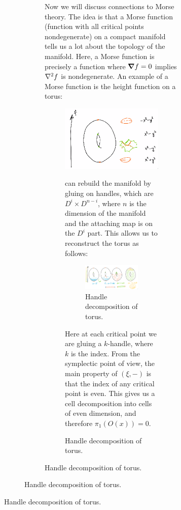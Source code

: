 \documentclass[leqno, openany]{memoir}
\theoremstyle{definition}
\theoremstyle{remark}
\theoremstyle{plain}
\theoremstyle{definition}
\theoremstyle{remark}
\begin{document}
\begin{figure}[H]
\begin{figure}[H]
\begin{figure}[H]
Now we will discuss connections to Morse theory. The idea is that a Morse
function (function with all critical points nondegenerate) on a compact
manifold tells us a lot about the topology of the manifold. Here, a Morse
function is precisely a function where $\grad f = 0$ implies $\laplacian f$ is
nondegenerate. An example of a Morse function is the height function on a
torus: \begin{figure}[H] \centering \includegraphics[scale=0.8]{morse.png}
    \caption{Morse function on a torus.}%
    can rebuild the manifold by gluing on handles, which are $D^i \times
    D^{n-i}$, where $n$ is the dimension of the manifold and the attaching map
    is on the $D^{i}$ part. This allows us to reconstruct the torus as follows:
    \begin{figure}[H] \centering \includegraphics[scale=0.4]{morse2.png}
        \caption{Handle decomposition of torus.}%
    \end{figure} Here at each critical point we are gluing a $k$-handle, where
    $k$ is the index. From the symplectic point of view, the main property of
    $(\xi, -)$ is that the index of any critical point is even. This gives us a
    cell decomposition into cells of even dimension, and therefore $\pi_1(O(x))
    = 0$.


\end{figure}
\end{figure}
\end{figure}
\end{figure}
\end{document}
